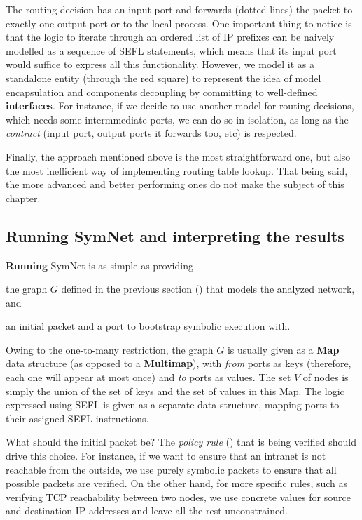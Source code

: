 The routing decision has an input port and forwards (dotted lines) the packet
to exactly one output port or to the local process.  One important thing to
notice is that the logic to iterate through an ordered list of IP prefixes can
be naively modelled as a sequence of  SEFL statements,
which means that its input port would suffice to express all this
functionality.  However, we model it as a standalone entity (through the red
square) to represent the idea of model encapsulation and components decoupling
by committing to well-defined \textbf{interfaces}.  For instance, if we decide
to use another model for routing decisions, which needs some intermmediate
ports, we can do so in isolation, as long as the \emph{contract} (input port,
output ports it forwards too, etc) is respected.

Finally, the  approach mentioned above is the most
straightforward one, but also the most inefficient way of implementing routing
table lookup. That being said, the more advanced and better performing ones do
not make the subject of this chapter.

\subsection{Running SymNet and interpreting the results}
\label{sub-sec:running-symnet}

\textbf{Running} SymNet is as simple as providing
\begin{enumerate*}[a)]
  \item the graph $G$ defined in the previous section
    () that models the analyzed
    network, and
  \item an initial packet and a port to bootstrap symbolic execution with.
\end{enumerate*}

Owing to the one-to-many restriction, the graph $G$ is usually given as a
\textbf{Map} data structure (as opposed to a \textbf{Multimap}), with
\emph{from} ports as keys (therefore, each one will appear at most once) and
\emph{to} ports as values.  The set $V$ of nodes is simply the union of the set
of keys and the set of values in this Map.  The logic expressed using SEFL is
given as a separate data structure, mapping ports to their assigned SEFL
instructions.

What should the initial packet be?  The \emph{policy rule}
() that is being verified
should drive this choice.  For instance, if we want to ensure that an intranet
is not reachable from the outside, we use purely symbolic packets to ensure
that all possible packets are verified.  On the other hand, for more specific
rules, such as verifying TCP reachability between two nodes, we use concrete
values for source and destination IP addresses and leave all the rest
unconstrained.

